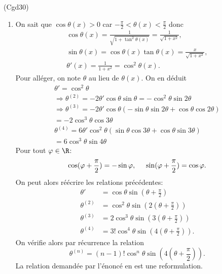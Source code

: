 \begin{tiny}(Cgd30)\end{tiny}
\begin{enumerate}
 \item On sait que $\cos \theta(x) >0$ car $-\frac{\pi}{2} < \theta(x) < \frac{\pi}{2}$ donc
\begin{multline*}
 \cos \theta(x) = \frac{1}{\sqrt{1+ \tan^2 \theta(x)}} = \frac{1}{\sqrt{1+x^2}},\\
\sin \theta(x) = \cos \theta(x) \tan \theta(x) = \frac{x}{\sqrt{1 + x^2}}, \\
\theta'(x) = \frac{1}{1+x^2} = \cos^2 \theta(x).
\end{multline*}
Pour alléger, on note $\theta$ au lieu de $\theta(x)$. On en déduit
\begin{multline*}
\theta' = \cos^2 \theta \\
\Rightarrow
\theta^{(2)} = -2 \theta'\cos \theta \sin \theta 
 = -\cos^2\theta \sin 2\theta \\
 \Rightarrow
\theta^{(3)} = - 2\theta'\cos \theta\left( -\sin \theta \sin 2\theta + \cos \theta \cos 2\theta\right) \\
 = -2 \cos^3\theta \cos 3\theta \\ 
\theta^{(4)} = 6\theta'\cos^2 \theta\left( \sin \theta \cos 3\theta + \cos \theta \sin 3\theta\right) \\
= 6 \cos^3\theta \sin 4\theta
\end{multline*}
Pour tout $\varphi \in \R$:
\begin{displaymath}
 \cos (\varphi + \frac{\pi}{2}) = - \sin \varphi,\hspace{0.5cm}
 \sin (\varphi + \frac{\pi}{2}) = \cos \varphi.
\end{displaymath}
On peut alors réécrire les relations précédentes:
\begin{align*}
\theta' &= \cos \theta \sin(\theta + \frac{\pi}{2})\\
\theta^{(2)} &= \cos^2 \theta \sin \left( 2(\theta + \frac{\pi}{2})\right) \\ 
\theta^{(3)} &= 2 \cos^3 \theta \sin \left( 3(\theta + \frac{\pi}{2})\right) \\
\theta^{(4)} &= 3! \cos^4 \theta \sin \left( 4(\theta + \frac{\pi}{2})\right).
\end{align*}
On vérifie alors par récurrence la relation
\begin{displaymath}
 \theta^{(n)} = (n-1)! \cos^{n}\theta \sin\left( 4(\theta + \frac{\pi}{2})\right).
\end{displaymath}
La relation demandée par l'énoncé en est une reformulation.


\end{enumerate}
